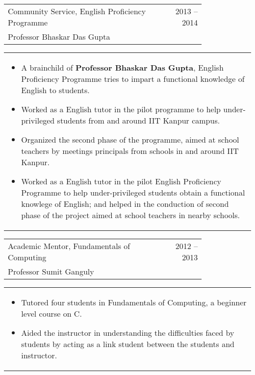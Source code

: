 \documentclass[a4paper,10pt]{article} %
\newcommand{\lproject}[4]{
    \begin{tabular}{p{0.80\linewidth}r}
        \textcolor{NavyBlue}{#2} & \multicolumn{1}{m{4cm}}{\raggedleft \textsc{#1}}\\
        #3
    \end{tabular}
    \begin{tabular}{p{\linewidth}}
    \vspace{-0.3cm}
        \footnotesize{#4}
    \end{tabular}
    \vspace{-0.5cm}
}
\begin{document}
\lproject {2013 -- 2014}
          {Community Service, English Proficiency Programme}
          {Professor Bhaskar Das Gupta}
          {
               \begin{itemize}[leftmargin=0.5cm]
                   \item A brainchild of \textbf{Professor Bhaskar Das Gupta}, English Proficiency Programme tries to impart a functional
                       knowledge of English to students.
                   \item Worked as a English tutor in the pilot programme to help under-privileged students from and around IIT Kanpur campus.
                   \item Organized the second phase of the programme, aimed at school teachers by meetings principals from schools in and
                       around IIT Kanpur.
                   \item Worked as a English tutor in the pilot English Proficiency Programme to help
                       under-privileged students obtain a functional knowlege of English; and helped in the
                       conduction of second phase of the project aimed at school teachers in nearby schools.
               \end{itemize}
          }

\lproject {2012 -- 2013}
          {Academic Mentor, Fundamentals of Computing}
          {Professor Sumit Ganguly}
          {
               \begin{itemize}[leftmargin=0.5cm]
                   \item Tutored four students in Fundamentals of Computing, a beginner level course on C.
                   \item Aided the instructor in understanding the difficulties faced by students by acting as a link
                       student between the students and instructor.
               \end{itemize}
          }
\end{document}
